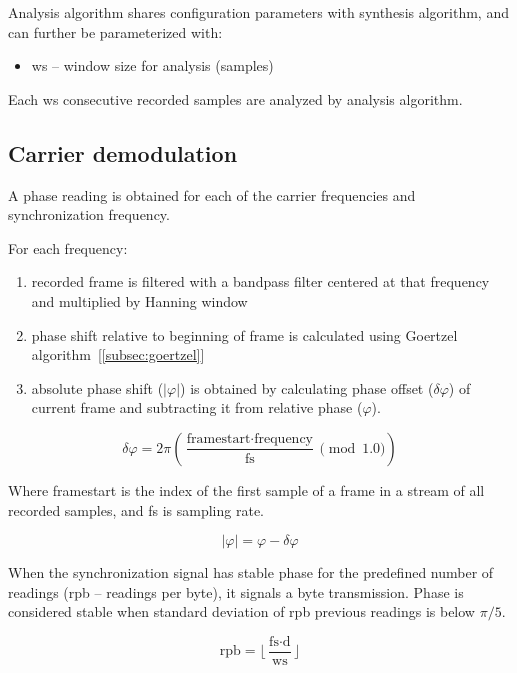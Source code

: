 Analysis algorithm shares configuration parameters with synthesis algorithm, and can further be parameterized with:

\begin{itemize}
\item ws -- window size for analysis (samples)
\end{itemize}

Each ws consecutive recorded samples are analyzed by analysis algorithm.

\subsection{Carrier demodulation}

A phase reading is obtained for each of the carrier frequencies and synchronization frequency.

For each frequency:
\begin{enumerate}
\item recorded frame is filtered with a bandpass filter centered at that frequency and multiplied by Hanning window %
\item phase shift relative to beginning of frame is calculated using Goertzel algorithm~[\ref{subsec:goertzel}]
\item absolute phase shift ($|\varphi|$) is obtained by calculating phase offset ($\delta\varphi$) of current frame and subtracting it from relative phase ($\varphi$).
\end{enumerate}

\begin{equation}
\delta\varphi = 2\pi(\frac{\textrm{framestart} \cdot \textrm{frequency}}{\textrm{fs}} \pmod{1.0})
\end{equation}

Where framestart is the index of the first sample of a frame in a stream of all recorded samples, and fs is sampling rate.

\begin{equation}
|\varphi| = \varphi - \delta\varphi
\end{equation}

When the synchronization signal has stable phase for the predefined number of readings (rpb -- readings per byte), it signals a byte transmission.
Phase is considered stable when standard deviation of rpb previous readings is below $\pi/5$.

\begin{equation}
\textrm{rpb} = \lfloor\frac{\textrm{fs} \cdot \textrm{d}}{\textrm{ws}}\rfloor
\end{equation}

